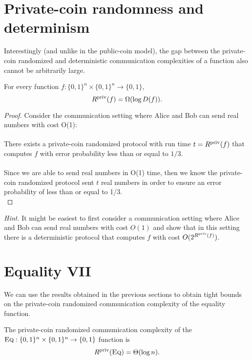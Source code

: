 \section{Private-coin randomness and determinism}

Interestingly (and unlike in the public-coin model), the gap between the private-coin randomized and deterministic communication complexities of a function also cannot be arbitrarily large. 

\begin{theorem}
	For every function $f : \{0,1\}^n \times \{0,1\}^n \to \{0,1\}$,
	\[
	R^{\mathrm{priv}}(f) = \Omega( \log D(f)).
	\]
\end{theorem}

\begin{proof}
	Consider the communication setting where Alice and Bob can send real numbers with cost O(1):\\
	\\
	There exists a private-coin randomized protocol with run time $t = R^{\mathrm{priv}}(f)$ that computes $f$ with error probability less than or equal to $1/3$.\\
	\\
	Since we are able to send real numbers in O(1) time, then we know the private-coin randomized protocol sent $t$ real numbers in order to ensure an error probability of less than or equal to 1/3. \\
	
\end{proof}

\bigskip
\begin{remark}
	\emph{Hint.} It might be easiest to first consider a communication setting where Alice and Bob can send real numbers with cost $O(1)$ and show that in this setting there is a deterministic protocol that computes $f$ with cost $O(2^{R^{\mathrm{priv}}(f)})$.
\end{remark}


\section{Equality VII}

We can use the results obtained in the previous sections to obtain tight bounds on the private-coin randomized communication complexity of the equality function.

\begin{theorem}
	The private-coin randomized communication complexity of the $\textsc{Eq} : \{0,1\}^n \times \{0,1\}^n \to \{0,1\}$ function is
	\[
	R^{\mathrm{priv}}(\textsc{Eq}) = \Theta( \log n).
	\]
\end{theorem}

